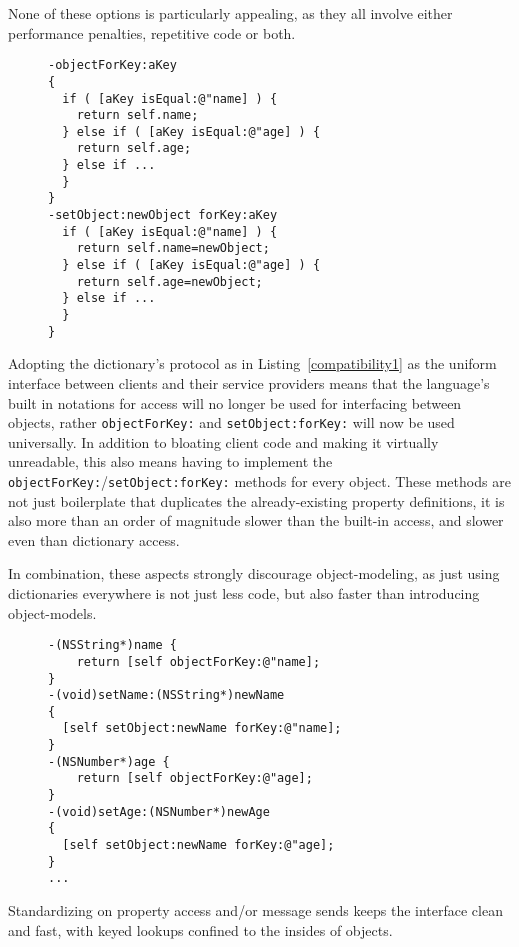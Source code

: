 \documentclass[preprint]{sigplanconf}
\begin{document}
None of these options is particularly appealing, as they all involve either performance penalties,
repetitive code or both.
	
\begin{figure}[htbp]
\begin{lstlisting}[style=numbers,label=compatibility1,caption=Making an object dictionary-compatible.]
-objectForKey:aKey
{
  if ( [aKey isEqual:@"name] ) {
    return self.name;		
  } else if ( [aKey isEqual:@"age] ) {
    return self.age;
  } else if ...
  }
}
-setObject:newObject forKey:aKey 
  if ( [aKey isEqual:@"name] ) {
    return self.name=newObject;		
  } else if ( [aKey isEqual:@"age] ) {
    return self.age=newObject;
  } else if ...
  }
}
\end{lstlisting}
\end{figure}

Adopting the dictionary's protocol as in Listing~\ref{compatibility1} as the uniform interface between
clients and their service providers means 
that the language's built in notations for access will no longer be used for interfacing between
objects, rather {\tt objectForKey:} and {\tt setObject:forKey:} will now be used universally.  In addition
to bloating client code and making it virtually unreadable, this also means having to implement
the {\tt objectForKey:}/{\tt setObject:forKey:} methods for every object.  These methods are not just
boilerplate that duplicates the already-existing property definitions, it is also more than an order
of magnitude slower than the built-in access, and slower even than dictionary access.

In combination, these aspects strongly discourage object-modeling, as just using dictionaries
everywhere is not just less code, but also faster than introducing object-models.

\begin{figure}[htbp]
\begin{lstlisting}[style=numbers,label=compatibility2,caption=Making a dictionary object-compatible.]
-(NSString*)name {
    return [self objectForKey:@"name];
}
-(void)setName:(NSString*)newName
{
  [self setObject:newName forKey:@"name];
}
-(NSNumber*)age {
    return [self objectForKey:@"age];
}
-(void)setAge:(NSNumber*)newAge
{
  [self setObject:newName forKey:@"age];
}
...
\end{lstlisting}
\end{figure}

Standardizing on property access and/or message sends keeps the interface clean and fast,
with keyed lookups confined to the insides of objects.  
\end{document}
